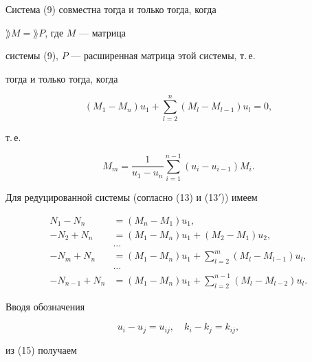 Система (9) совместна тогда и только тогда, когда


$\rang M=\rang P$, где $M$ --- матрица


системы (9), $P$ --- расширенная матрица этой системы, т.\,е.


тогда и только тогда, когда


$$


(M_1-M_n)u_1+\sum^n_{l=2}(M_l-M_{l-1})u_l=0,


$$


т.\,е.


\begin{equation}


M_m=\frac{1}{u_1-u_n}\sum^{n-1}_{i=1}(u_i-u_{i-1})M_i.


\end{equation}


Для редуцированной системы (согласно (13) и (13$'$)) имеем


\begin{equation}


\begin{split}


N_1-N_n&=(M_n-M_1)u_1,\\


-N_2+N_n&=(M_1-M_n)u_1+(M_2-M_1)u_2,\\


&\dots\\


-N_m+N_n&=(M_1-M_n)u_1+\sum^m_{l=2}(M_l-M_{l-1})u_l,\\


&\dots\\


-N_{n-1}+N_n&=(M_1-M_n)u_1+\sum^{n-1}_{l=2}(M_l-M_{l-2})u_l.


\end{split}


\end{equation}


Вводя обозначения


$$


u_i-u_j=u_{ij},\quad k_i-k_j=k_{ij},


$$


из (15) получаем


